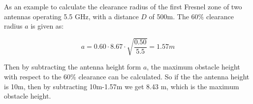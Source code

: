 \begin{where}
\end{where}

As an example to calculate the clearance radius of the first Fresnel zone of two antennas operating 5.5 GHz, with a distance $D$ of 500m. The 60$\%$ clearance radius $a$ is given as:

\begin{equation}
a = 0.60\cdot8.67 \cdot \sqrt{\frac{0.50}{5.5}} = 1.57 m
\label{fres:eq_ex}
\end{equation}

Then by subtracting the antenna height form $a$, the maximum obstacle height with respect to the 60$\%$ clearance can be calculated. So if the the antenna height is 10m, then by subtracting 10m-1.57m we get 8.43 m, which is the maximum obstacle height.  %













 





